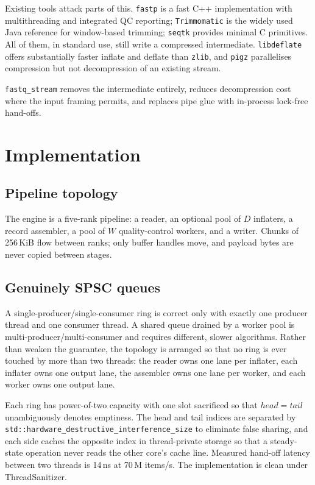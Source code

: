 Existing tools attack parts of this. \texttt{fastp}
\citep{chen2018fastp} is a fast C++ implementation with
multithreading and integrated QC reporting; \texttt{Trimmomatic}
\citep{bolger2014trimmomatic} is the widely used Java reference for
window-based trimming; \texttt{seqtk} provides minimal C primitives. All of
them, in standard use, still write a compressed intermediate.
\texttt{libdeflate} \citep{biggers2016libdeflate} offers substantially
faster inflate and deflate than \texttt{zlib}, and \texttt{pigz} parallelises
compression but not decompression of an existing stream.

\texttt{fastq\_stream} removes the intermediate entirely, reduces decompression
cost where the input framing permits, and replaces pipe glue with in-process
lock-free hand-offs.

\section{Implementation}

\subsection{Pipeline topology}

The engine is a five-rank pipeline: a reader, an optional pool of $D$
inflaters, a record assembler, a pool of $W$ quality-control workers, and a
writer. Chunks of 256\,KiB flow between ranks; only buffer handles move, and
payload bytes are never copied between stages.

\subsection{Genuinely SPSC queues}

A single-producer/single-consumer ring is correct only with exactly one
producer thread and one consumer thread. A shared queue drained by a worker
pool is multi-producer/multi-consumer and requires different, slower
algorithms. Rather than weaken the guarantee, the topology is arranged so that
no ring is ever touched by more than two threads: the reader owns one lane per
inflater, each inflater owns one output lane, the assembler owns one lane per
worker, and each worker owns one output lane.

Each ring has power-of-two capacity with one slot sacrificed so that
$\mathit{head}=\mathit{tail}$ unambiguously denotes emptiness. The head and
tail indices are separated by \texttt{std::hardware\_destructive\_interference\_size}
to eliminate false sharing, and each side caches the opposite index in
thread-private storage so that a steady-state operation never reads the other
core's cache line. Measured hand-off latency between two threads is 14\,ns at
70\,M items/s. The implementation is clean under ThreadSanitizer.

